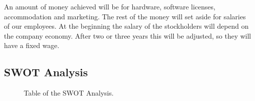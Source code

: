 An amount of money achieved will be for hardware, software licenses, accommodation and marketing. The rest of the money will set aside for salaries of our employees. At the beginning the salary of the stockholders will depend on the company economy. After two or three years this will be adjusted, so they will have a fixed wage.


\subsection{SWOT Analysis}
\begin{figure}[H]
	\centering
	\caption{Table of the SWOT Analysis.}
	\label{fig:SWOT}
\end{figure}


